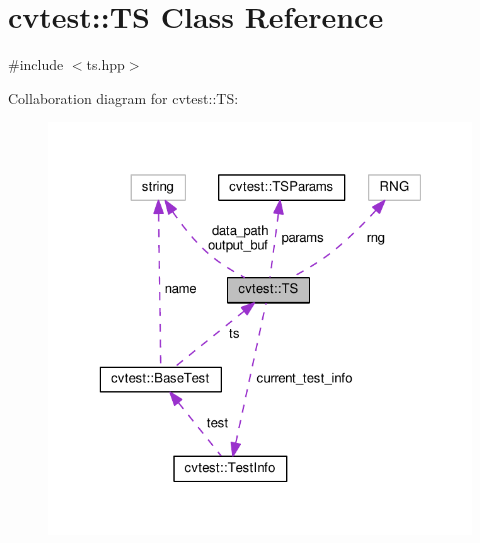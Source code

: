\hypertarget{classcvtest_1_1TS}{\section{cvtest\-:\-:T\-S Class Reference}
\label{classcvtest_1_1TS}
}


{\ttfamily \#include $<$ts.\-hpp$>$}



Collaboration diagram for cvtest\-:\-:T\-S\-:\nopagebreak
\begin{figure}[H]
\begin{center}
\leavevmode
\includegraphics[width=323pt]{classcvtest_1_1TS__coll__graph}
\end{center}
\end{figure}
